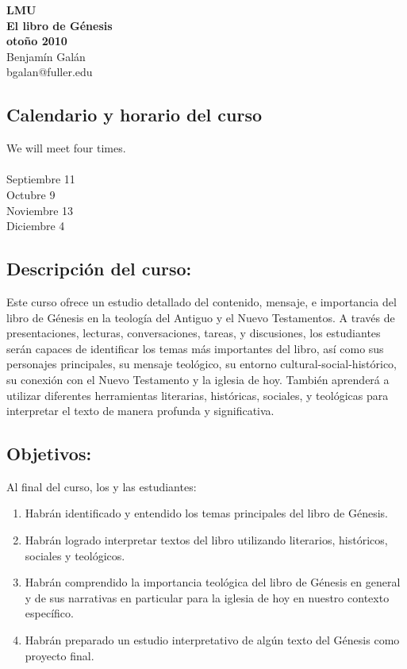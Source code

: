 \documentclass[letterpaper,12pt]{article}
\begin{document}
\pagestyle{empty}
\begin{center}
\textbf{\large LMU\\El libro de Génesis\\otoño 2010}\\
Benjamín Galán\\bgalan@fuller.edu
\end{center}

\subsection*{Calendario y horario del curso}
We will meet four times. \\
\\
Septiembre 11\\
Octubre 9\\
Noviembre 13\\
Diciembre 4

\subsection*{Descripción del curso:}
Este curso ofrece un estudio detallado del contenido, mensaje, e importancia del libro de Génesis en la teología del Antiguo y el Nuevo Testamentos. A través de presentaciones, lecturas, conversaciones, tareas, y discusiones, los estudiantes serán capaces de identificar los temas más importantes del libro, así como sus personajes principales, su mensaje teológico, su entorno cultural-social-histórico, su conexión con el Nuevo Testamento y la iglesia de hoy. También aprenderá a utilizar diferentes herramientas literarias, históricas, sociales, y teológicas para interpretar el texto de manera profunda y significativa.

\subsection*{Objetivos:}
Al final del curso, los y las estudiantes:
\begin{enumerate}{}{}
\item Habrán identificado y entendido los temas principales del libro de Génesis.
\item Habrán logrado interpretar textos del libro utilizando literarios, históricos, sociales y teológicos.
\item Habrán comprendido la importancia teológica del libro de Génesis en general y de sus narrativas en particular para la iglesia de hoy en nuestro contexto específico.
\item Habrán preparado un estudio interpretativo de algún texto del Génesis como proyecto final.
\end{enumerate}
\end{document}
